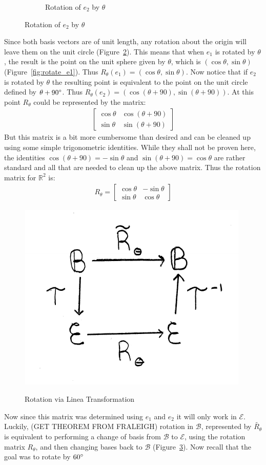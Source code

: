 \documentclass[12pt,letter]{article}
\begin{document}
\begin{figure}[h]
\begin{subfigure}[h]{0.45\textwidth}
		\caption{Rotation of $e_2$ by $\theta$}
		\label{fig:rotate_e2}
	\end{subfigure}
	\label{fig:rotations}
\end{figure}

Since both basis vectors are of unit length, any rotation about the origin will leave them on the unit circle (Figure~\ref{fig:rotations}). This means that when $e_1$ is rotated by $\theta$, the result is the point on the unit sphere given by $\theta$, which is $(\cos{\theta} , \sin{\theta})$ (Figure~\ref{fig:rotate_e1}). Thus $R_\theta(e_1) = (\cos{\theta} , \sin{\theta})$. Now notice that if $e_2$ is rotated by $\theta$ the resulting point is equivalent to the point on the unit circle defined by $\theta + 90\degree$. Thus $R_\theta(e_2) = (\cos{(\theta + 90)} , \sin{(\theta + 90)})$. At this point $R_\theta$ could be represented by the matrix:
%
\begin{align*}
	\begin{bmatrix}
		\cos{\theta} & \cos{(\theta + 90)} \\
		\sin{\theta} & \sin{(\theta + 90)}
	\end{bmatrix}
\end{align*}
%
But this matrix is a bit more cumbersome than desired and can be cleaned up using some simple trigonometric identities. While they shall not be proven here, the identities $\cos{(\theta + 90)} = -\sin{\theta}$ and $\sin{(\theta + 90)} = \cos{\theta}$ are rather standard and all that are needed to clean up the above matrix. Thus the rotation matrix for $\mathbb{R}^2$ is:
\begin{align*}
	R_\theta =
	\begin{bmatrix}
		\cos{\theta} & -\sin{\theta} \\
		\sin{\theta} & \cos{\theta}
	\end{bmatrix}
\end{align*}

\begin{figure}
	\centering
	\vspace{-15pt}
	\caption{Rotation via Linea Transformation}
	\includegraphics[width=.3\textwidth]{linear_trans.pdf}
	\vspace{-15pt}
	\label{fig:linear_transform}
\end{figure}
%
Now since this matrix was determined using $e_1$ and $e_2$ it will only work in $\mathcal{E}$. Luckily, (GET THEOREM FROM FRALEIGH) rotation in $\mathcal{B}$, represented by $\widetilde{R_\theta}$ is equivalent to performing a change of basis from $\mathcal{B}$ to $\mathcal{E}$, using the rotation matrix $R_\theta$, and then changing bases back to $\mathcal{B}$ (Figure~\ref{fig:linear_transform}). Now recall that the goal was to rotate by $60\degree$
\end{document}
